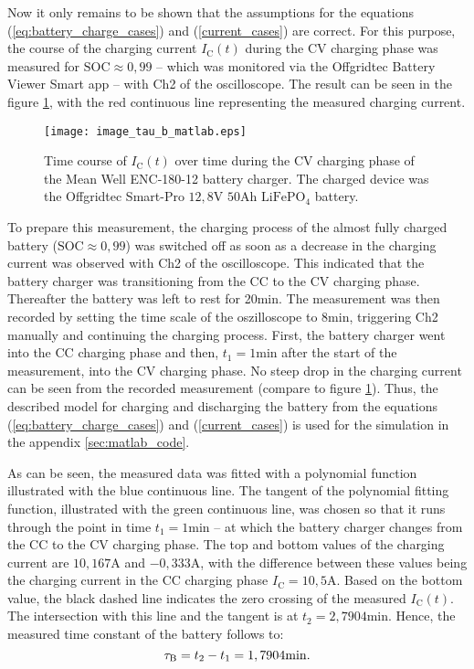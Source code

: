 Now it only remains to be shown that the assumptions for the equations (\ref{eq:battery_charge_cases}) and (\ref{current_cases}) are correct. For this purpose, the course of the charging current $I_\mathrm{C}(t)$ during the CV charging phase was measured for $\mathrm{SOC} \approx 0,99$ -- which was monitored via the Offgridtec Battery Viewer Smart app -- with Ch2 of the oscilloscope. The result can be seen in the figure \ref{fig:image_tau_b_matlab}, with the red continuous line representing the measured charging current. 
\begin{figure}[h!]
	\centering
  	\texttt{[image: image\_tau\_b\_matlab.eps]}
  	\caption{Time course of $I_\mathrm{C}(t)$ over time during the CV charging phase of the Mean Well ENC-180-12 battery charger. The charged device was the Offgridtec Smart-Pro $12,8\mathrm{V}$ $50\mathrm{Ah}$ $\mathrm{LiFePO_4}$ battery.}
	\label{fig:image_tau_b_matlab}
\end{figure}
To prepare this measurement, the charging process of the almost fully charged battery ($\mathrm{SOC} \approx 0,99$) was switched off as soon as a decrease in the charging current was observed with Ch2 of the oscilloscope. This indicated that the battery charger was transitioning from the CC to the CV charging phase. Thereafter the battery was left to rest for 20min. The measurement was then recorded by setting the time scale of the oszilloscope to 8min, triggering Ch2 manually and continuing the charging process. First, the battery charger went into the CC charging phase and then, $t_1 = 1 \mathrm{min}$ after the start of the measurement, into the CV charging phase. No steep drop in the charging current can be seen from the recorded measurement (compare to figure \ref{fig:image_tau_b_matlab}). Thus, the described model for charging and discharging the battery from the equations (\ref{eq:battery_charge_cases}) and (\ref{current_cases}) is used for the \MATLAB simulation in the appendix \ref{sec:matlab_code}. 

As can be seen, the measured data was fitted with a polynomial function illustrated with the blue continuous line. The tangent of the polynomial fitting function, illustrated with the green continuous line, was chosen so that it runs through the point in time $t_1 = 1\mathrm{min}$ -- at which the battery charger changes from the CC to the CV charging phase. The top and bottom values of the charging current are $10,167\mathrm{A}$ and $-0,333\mathrm{A}$, with the difference between these values being the charging current in the CC charging phase $I_\mathrm{C} = 10,5\mathrm{A}$. Based on the bottom value, the black dashed line indicates the zero crossing of the measured $I_\mathrm{C}(t)$. The intersection with this line and the tangent is at $t_2 = 2,7904\mathrm{min}$. Hence, the measured time constant of the battery follows to:
\begin{equation}\label{eq:tau_battery_measured}
	\centering
	\tau_\mathrm{B} = t_2 - t_1 = 1,7904\mathrm{min}\text{.}
\end{equation}

